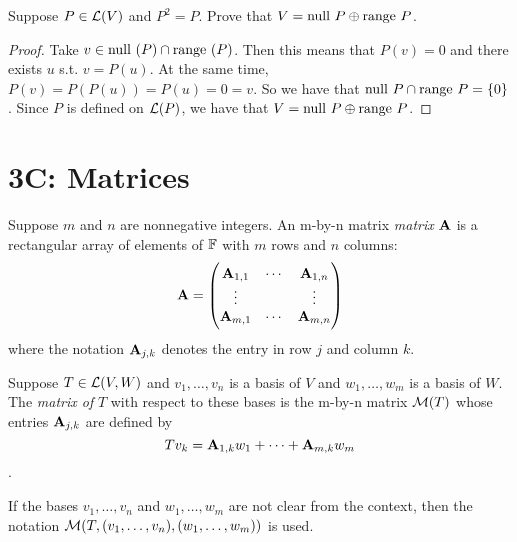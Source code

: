 \documentclass{extarticle}
\begin{document}
\begin{problem}{27}
Suppose \(P \in \mathcal{L}(V)\) and \(P^2 = P\). Prove that \(V = \text{null } P \oplus \text{range } P\).
\end{problem}

\begin{proof}
Take \(v \in \text{null } (P) \cap \text{range } (P)\). Then this means that \(P(v) = 0\) and there exists 
\(u\) s.t. \(v = P(u)\). At the same time, \(P(v) = P(P(u)) = P(u) = 0 =v\). So we have 
that \(\text{null } P \cap \text{range } P = \{0\}\). Since \(P\) is defined on \(\mathcal{L}(P)\), we have that 
\(V = \text{null } P \oplus \text{range } P\). 
\end{proof}








\newpage

\section*{3C: Matrices}

\begin{definition}[matrix, \(\Ab_{j,k}\)]
    Suppose \(m\) and \(n\) are nonnegative integers. An  m-by-n matrix \emph{matrix}
    \(\mathbf{A}\) is a rectangular array of elements of \(\mathbb{F}\) with \(m\) rows and \(n\) columns:
    \[\mathbf{A} = \begin{pmatrix}
        \mathbf{A}_{1, 1} & \cdots & \mathbf{A}_{1, n} \\ 
        \vdots & & \vdots \\ 
        \mathbf{A}_{m, 1} & \cdots & \mathbf{A}_{m, n}
    \end{pmatrix}\]
where the notation \(\Ab_{j, k}\) denotes the entry in row \(j\) and column \(k\). 
\end{definition}


\begin{definition}
    Suppose \(T \in \mathcal{L}(V, W)\) and \(v_1, \ldots, v_n\) is a basis of \(V\) and \(w_1, \ldots, 
    w_m\) is a basis of \(W\). The \emph{matrix of} \(T\) with respect to these bases is the 
    m-by-n matrix \(\mathcal{M}(T)\) whose entries \(\Ab_{j,k}\) are defined by 
    \[T v_k = \mathbf{A}_{1, k} w_1 + \cdots + \mathbf{A}_{m, k} w_m\]. 

    If the bases \(v_1, \ldots, v_n\) and \(w_1, \ldots, w_m\) are not clear from the context, then 
    the notation \(\mathcal{M}(T, (v_1, \ldots, v_n), (w_1, \ldots, w_m))\) is used. 
\end{definition}
\end{document}

